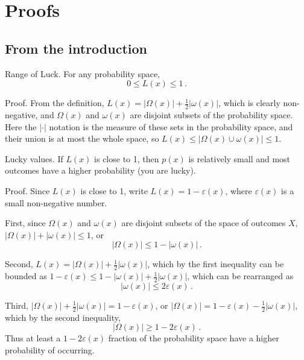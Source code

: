 \chapter{Proofs}

\section{From the introduction}

\begin{theorem}{Range of Luck.} 
For any probability space,
\begin{equation}
0 \leq L(x) \leq 1 \,.
\end{equation}

Proof.  From the definition, $L(x)=|\Omega(x)|+\frac{1}{2} |\omega(x)|$, which is clearly non-negative, and $\Omega(x)$ and $\omega(x)$ are disjoint subsets of the probability space.  Here the $| \cdot |$ notation is the measure of these sets in the probability space, and their union is at most the whole space, so $L(x) \leq |\Omega(x) \cup \omega(x)| \leq 1$.
\end{theorem}

\begin{theorem}{Lucky values.}
If $L(x)$ is close to 1, then $p(x)$ is relatively small and most outcomes have a higher probability (you are lucky).

Proof.  Since $L(x)$ is close to 1, write $L(x)=1-\varepsilon(x)$, where $\varepsilon(x)$ is a small non-negative number.

First, since $\Omega(x)$ and $\omega(x)$ are disjoint subsets of the space of outcomes $X$, $|\Omega(x)|+|\omega(x)| \leq 1$, or 
\begin{equation*}
|\Omega(x)| \leq 1-|\omega(x)| \,.
\end{equation*}

Second, $L(x)=|\Omega(x)|+\frac{1}{2}|\omega(x)|$, which by the first inequality can be bounded as $1-\varepsilon(x)\leq  1-|\omega(x)|+\frac{1}{2}|\omega(x)|$, which can be rearranged as
\begin{equation*}
|\omega(x)| \leq 2 \varepsilon(x) \,.
\end{equation*}

Third, $|\Omega(x)|+\frac{1}{2}|\omega(x)| = 1-\varepsilon(x)$, or $|\Omega(x)|=1-\varepsilon(x)-\frac{1}{2}|\omega(x)|$, which by the second inequality,
\begin{equation}
|\Omega(x)| \geq 1-2 \varepsilon(x) \,.
\end{equation}
Thus at least a $1-2 \varepsilon(x)$ fraction of the probability space have a higher probability of occurring.
\end{theorem}

